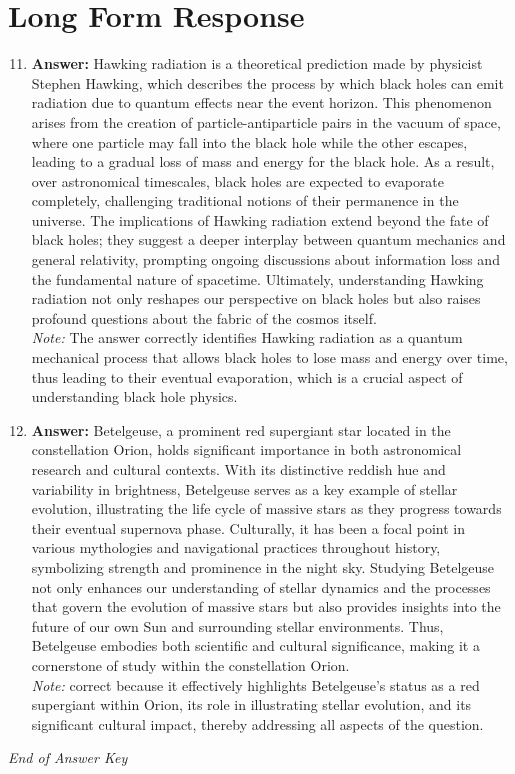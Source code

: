\documentclass[12pt]{article}
\begin{document}
\section*{Long Form Response}
\begin{enumerate}[label=\arabic*.]
\setcounter{enumi}{10}
\item \textbf{Answer:} Hawking radiation is a theoretical prediction made by physicist Stephen Hawking, which describes the process by which black holes can emit radiation due to quantum effects near the event horizon. This phenomenon arises from the creation of particle-antiparticle pairs in the vacuum of space, where one particle may fall into the black hole while the other escapes, leading to a gradual loss of mass and energy for the black hole. As a result, over astronomical timescales, black holes are expected to evaporate completely, challenging traditional notions of their permanence in the universe. The implications of Hawking radiation extend beyond the fate of black holes; they suggest a deeper interplay between quantum mechanics and general relativity, prompting ongoing discussions about information loss and the fundamental nature of spacetime. Ultimately, understanding Hawking radiation not only reshapes our perspective on black holes but also raises profound questions about the fabric of the cosmos itself.
\\ \textit{Note:} The answer correctly identifies Hawking radiation as a quantum mechanical process that allows black holes to lose mass and energy over time, thus leading to their eventual evaporation, which is a crucial aspect of understanding black hole physics.
\item \textbf{Answer:} Betelgeuse, a prominent red supergiant star located in the constellation Orion, holds significant importance in both astronomical research and cultural contexts. With its distinctive reddish hue and variability in brightness, Betelgeuse serves as a key example of stellar evolution, illustrating the life cycle of massive stars as they progress towards their eventual supernova phase. Culturally, it has been a focal point in various mythologies and navigational practices throughout history, symbolizing strength and prominence in the night sky. Studying Betelgeuse not only enhances our understanding of stellar dynamics and the processes that govern the evolution of massive stars but also provides insights into the future of our own Sun and surrounding stellar environments. Thus, Betelgeuse embodies both scientific and cultural significance, making it a cornerstone of study within the constellation Orion.
\\ \textit{Note:} correct because it effectively highlights Betelgeuse's status as a red supergiant within Orion, its role in illustrating stellar evolution, and its significant cultural impact, thereby addressing all aspects of the question.
\end{enumerate}

\vfill
\noindent\textit{End of Answer Key}
\end{document}
